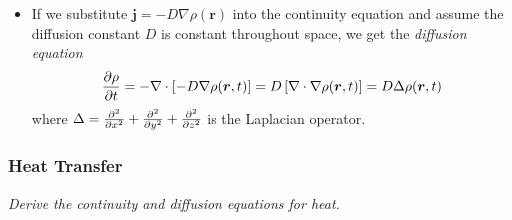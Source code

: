 \documentclass[11pt, a4paper]{article}
\begin{document}
\begin{itemize}
	\item If we substitute $ \bm{j} = - D \nabla \rho(\bm{r}) $ into the continuity equation and assume  the diffusion constant $ D $ is constant throughout space, we get the \textit{diffusion equation}
	\begin{equation*}
		\pdv{\rho}{t} = - \nabla \cdot \left[- D \nabla \rho(\bm{r}, t)\right] = D \left[\nabla \cdot \nabla \rho(\bm{r}, t)\right] = D \Delta \rho(\bm{r}, t)
	\end{equation*}
	where $ \Delta = \pdv[2]{}{x} + \pdv[2]{}{y} + \pdv[2]{}{z}$ is the Laplacian operator.
	
\end{itemize}



\subsubsection{Heat Transfer}
\textit{Derive the continuity and diffusion equations for heat.}
\end{document}
